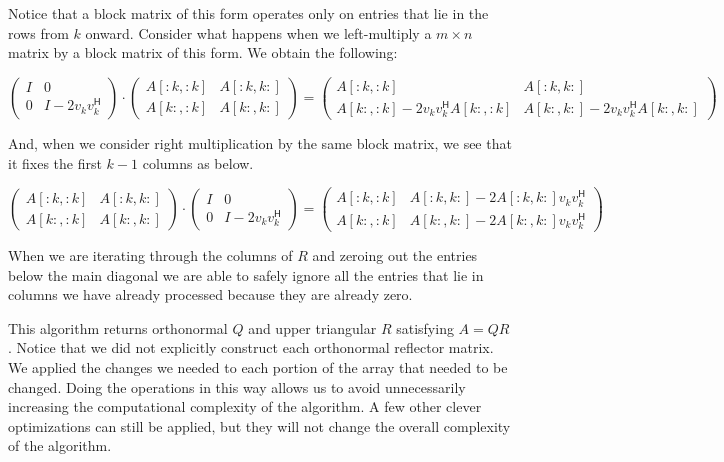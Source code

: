 Notice that a block matrix of this form operates only on entries that lie in the rows from $k$ onward.
Consider what happens when we left-multiply a $m \times n$ matrix by a block matrix of this form.
We obtain the following:

\[
\begin{pmatrix}
I & 0 \\
0 & I - 2 v_k v_k^\mathsf{H}
\end{pmatrix}
\cdot
\begin{pmatrix}
A[:k,:k] & A[:k,k:] \\
A[k:,:k] & A[k:,k:]
\end{pmatrix}
=
\begin{pmatrix}
A[:k,:k] & A[:k,k:] \\
A[k:,:k] - 2 v_k v_k^\mathsf{H} A[k:,:k] & A[k:,k:] - 2 v_k v_k^\mathsf{H} A[k:,k:]
\end{pmatrix}
\]

And, when we consider right multiplication by the same block matrix, we see that it fixes the first $k-1$ columns as below.

\[
\begin{pmatrix}
A[:k,:k] & A[:k,k:] \\
A[k:,:k] & A[k:,k:]
\end{pmatrix}
\cdot
\begin{pmatrix}
I & 0 \\
0 & I - 2 v_k v_k^\mathsf{H}
\end{pmatrix}
=
\begin{pmatrix}
A[:k,:k] & A[:k,k:] - 2  A[:k,k:] v_k v_k^\mathsf{H} \\
A[k:,:k] & A[k:,k:] - 2 A[k:,k:] v_k v_k^\mathsf{H}
\end{pmatrix}
\]

When we are iterating through the columns of $R$ and zeroing out the entries below the main diagonal we are able to safely ignore all the entries that lie in columns we have already processed because they are already zero.

This algorithm returns orthonormal $Q$ and upper triangular $R$ satisfying $A = QR$.
Notice that we did not explicitly construct each orthonormal reflector matrix.
We applied the changes we needed to each portion of the array that needed to be changed.
Doing the operations in this way allows us to avoid unnecessarily increasing the computational complexity of the algorithm.
A few other clever optimizations can still be applied, but they will not change the overall complexity of the algorithm.

